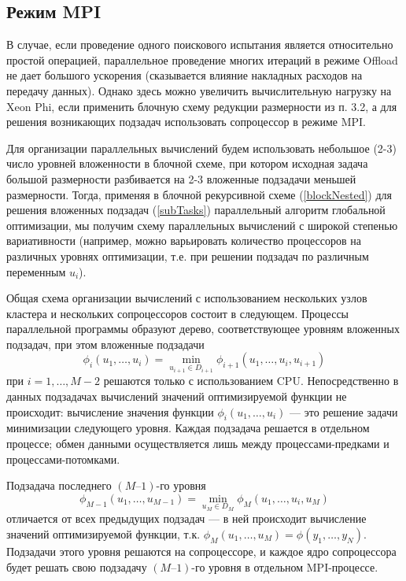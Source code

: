 \documentclass[a4paper]{article}
\begin{document}
\subsection{Режим MPI}
В случае, если проведение одного поискового испытания является относительно простой операцией, параллельное проведение многих итераций в режиме Offload не дает большого ускорения (сказывается влияние накладных расходов на передачу данных). Однако здесь можно увеличить вычислительную нагрузку на Xeon Phi, если применить блочную схему редукции размерности из п. 3.2, а для решения возникающих подзадач использовать сопроцессор в режиме MPI.
\par
Для организации параллельных вычислений будем использовать небольшое (2-3) число уровней вложенности в блочной схеме, при котором исходная задача большой размерности разбивается на 2-3 вложенные подзадачи меньшей размерности. Тогда, применяя в блочной рекурсивной схеме (\ref{blockNested}) для решения вложенных подзадач (\ref{subTasks}) параллельный алгоритм глобальной оптимизации, мы получим схему параллельных вычислений с широкой степенью вариативности (например, можно варьировать количество процессоров на различных уровнях оптимизации, т.е. при решении подзадач по различным переменным \(u_i\)).
\par
Общая схема организации вычислений с использованием нескольких узлов кластера и нескольких сопроцессоров состоит в следующем. Процессы параллельной программы образуют дерево, соответствующее уровням вложенных подзадач, при этом вложенные подзадачи
\begin{displaymath}
\phi_i(u_1,\dots,u_i)=\min_{u_{i+1}\in D_{i+1}}\phi_{i+1}(u_1,\dots,u_i,u_{i+1})
\end{displaymath}
при \(i=1,\dots,M-2\) решаются только с использованием CPU. Непосредственно в данных подзадачах вычислений значений оптимизируемой функции не происходит: вычисление значения функции \(\phi_i(u_1,\dots,u_i)\) --- это решение задачи минимизации следующего уровня. Каждая подзадача решается в отдельном процессе; обмен данными осуществляется лишь между процессами-предками и процессами-потомками.
\par
Подзадача последнего \((M–1)\)-го уровня 
\begin{displaymath}
\phi_{M-1}(u_1,\dots,u_{M-1})=\min_{u_{M}\in D_{M}}\phi_{M}(u_1,\dots,u_i,u_{M})
\end{displaymath} 
отличается от всех предыдущих подзадач --- в ней происходит вычисление значений оптимизируемой функции, т.к. \(\phi_M(u_1,\dots,u_M)=\phi(y_1,\dots,y_N)\). Подзадачи этого уровня решаются на сопроцессоре, и каждое ядро сопроцессора будет решать свою подзадачу \((M–1)\)-го уровня в отдельном MPI-процессе.
\end{document}
